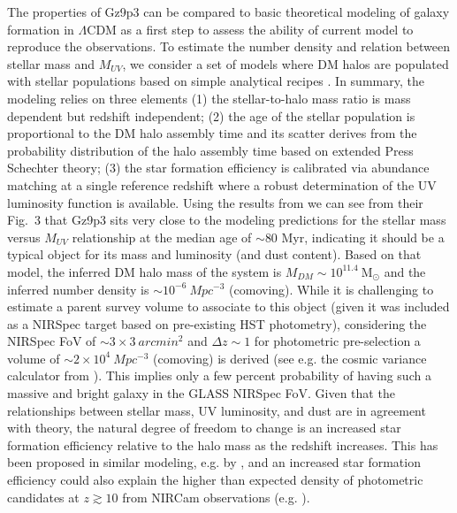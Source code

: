 \documentclass[sn-mathphys]{sn-jnl}%
\theoremstyle{thmstyleone}%
\theoremstyle{thmstyletwo}%
\theoremstyle{thmstylethree}%
\begin{document}
The properties of Gz9p3 can be compared to basic theoretical modeling of galaxy formation in $\Lambda$CDM as a first step to assess the ability of current model to reproduce the observations. To estimate the number density and relation between stellar mass and $M_{UV}$, we consider a set of models where DM halos are populated with stellar populations based on simple analytical recipes \citep{Mason2023,Mason2015,Ren2019}. In summary, the modeling relies on three elements (1) the stellar-to-halo mass ratio is mass dependent but redshift independent; (2) the age of the stellar population is proportional to the DM halo assembly time and its scatter derives from the probability distribution of the halo assembly time based on extended Press Schechter theory; (3) the star formation efficiency is calibrated via abundance matching at a single reference redshift where a robust determination of the UV luminosity function is available. Using the results from \cite{Mason2023} we can see from their Fig.~3 that Gz9p3 sits very close to the modeling predictions for the stellar mass versus $M_{UV}$ relationship at the median age of $\sim 80$ Myr, indicating it should be a typical object for its mass and luminosity (and dust content). Based on that model, the inferred DM halo mass of the system is $M_{DM}\sim 10^{11.4}~\mathrm{M_{\odot}}$ and the inferred number density is $\sim 10^{-6}~Mpc^{-3}$ (comoving). While it is challenging to estimate a parent survey volume to associate to this object (given it was included as a NIRSpec target based on pre-existing HST photometry), considering the NIRSpec FoV of $\sim 3\times 3~arcmin^2$  and $\Delta z \sim 1$ for photometric pre-selection a volume of $\sim 2\times 10^4~Mpc^{-3}$ (comoving) is derived (see e.g. the cosmic variance calculator from \cite{Trenti08}). This implies only a few percent probability of having such a massive and bright galaxy in the GLASS NIRSpec FoV. Given that the relationships between stellar mass,  UV luminosity, and dust are in agreement with theory, the natural degree of freedom to change is an increased star formation efficiency relative to the halo mass as the redshift increases. This has been proposed in similar modeling, e.g. by \cite{Behroozi2015}, and an increased star formation efficiency could also explain the higher than expected density of photometric candidates at $z\gtrsim 10$ from NIRCam observations (e.g. \cite{Castellano22b}).
\end{document}
